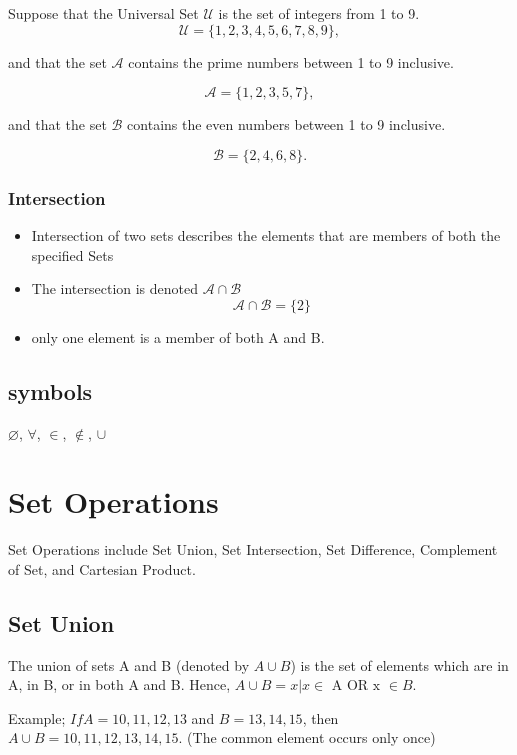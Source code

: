 \documentclass[12pt]{article}
\begin{document}
Suppose that the Universal Set $\mathcal{U}$ is the set of integers from 1 to 9.
\[ \mathcal{U} = \{1,2,3,4,5,6,7,8,9\}, \]

and that the set $\mathcal{A}$ contains the prime numbers between 1 to 9 inclusive.

\[ \mathcal{A} = \{1,2,3,5,7\}, \]

and that the set $\mathcal{B}$ contains the even numbers between 1 to 9 inclusive.

\[ \mathcal{B} = \{2,4,6,8\}. \]


\subsubsection*{Intersection}
\begin{itemize}

\item Intersection of two sets describes the elements that are members of both the specified Sets

\item The intersection is denoted $\mathcal{A\cap B}$ 
\[ \mathcal{A\cap B} = \{2\}\]

\item only one element is a member of both A and B.
\end{itemize}


\subsection*{symbols}
$\varnothing$,
$\forall$,
$\in$,
$\notin$,
$\cup$
\newpage

\section{Set Operations}
Set Operations include Set Union, Set Intersection, Set Difference, Complement of Set, and Cartesian Product.

\subsection{Set Union}
The union of sets A and B (denoted by $A \cup B$) is the set of elements which are in A, in B, or in both A and B. Hence, $A \cup B={x|x \in \mbox{ A OR x } \in B}$.

Example; $If A={10,11,12,13}$ and $B = {13,14,15}$, then $A \cup B={10,11,12,13,14,15}$. (The common element occurs only once)
\end{document}
